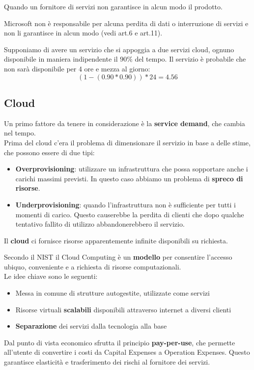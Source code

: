 \begin{definition}
	Quando un fornitore di servizi non garantisce in alcun modo il prodotto.
	\begin{example}
		Microsoft non è responsabile per alcuna perdita di dati o interruzione di servizi e non li garantisce in alcun modo (vedi art.6 e art.11).
	\end{example}
\end{definition}

\begin{example}
	Supponiamo di avere un servizio che si appoggia a due servizi cloud, ognuno disponibile in maniera indipendente il $90\%$ del tempo.
	Il servizio è probabile che non sarà disponibile per 4 ore e mezza al giorno:
	\begin{equation*}
		(1-(0.90 * 0.90))*24=4.56
	\end{equation*}
\end{example}

\subsection{Cloud}
Un primo fattore da tenere in considerazione è la \textbf{service demand}, che cambia nel tempo.\\
Prima del cloud c'era il problema di dimensionare il servizio in base a delle stime, che possono essere di due tipi:
\begin{itemize}
	\item \textbf{Overprovisioning}: utilizzare un infrastruttura che possa sopportare anche i carichi massimi previsti. In questo caso abbiamo un problema di \textbf{spreco di risorse}.
	\item \textbf{Underprovisioning}: quando l'infrastruttura non è sufficiente per tutti i momenti di carico. Questo causerebbe la perdita di clienti che dopo qualche tentativo fallito di utilizzo abbandonerebbero il servizio.
\end{itemize}
Il \textbf{cloud} ci fornisce risorse apparentemente infinite disponibili su richiesta.
\begin{definition}[Cloud]
	Secondo il NIST il Cloud Computing è un \textbf{modello} per consentire l'accesso ubiquo, conveniente e a richiesta di risorse computazionali.\\
	Le idee chiave sono le seguenti:
	\begin{itemize}
		\item Messa in comune di strutture autogestite, utilizzate come servizi
		\item Risorse virtuali \textbf{scalabili} disponibili attraverso internet a diversi clienti
		\item \textbf{Separazione} dei servizi dalla tecnologia alla base
	\end{itemize}
	Dal punto di vista economico sfrutta il principio \textbf{pay-per-use}, che permette all'utente di convertire i costi da Capital Expenses a Operation Expenses. Questo garantisce  elasticità e trasferimento dei rischi al fornitore dei servizi.
\end{definition}

